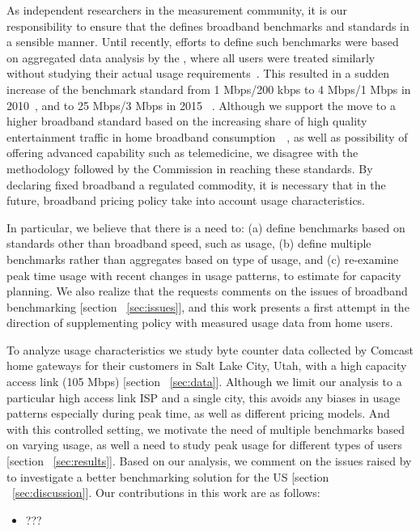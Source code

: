 As independent researchers in the measurement community, it is our responsibility to ensure that the \FCC defines broadband benchmarks and standards in a sensible manner. Until recently, efforts to define such benchmarks were based on aggregated data analysis by the \FCC, where all users were treated similarly without studying their actual usage requirements~\cite{report2010-2014}. This resulted in a sudden increase of the benchmark standard from 1 Mbps/200 kbps to 4 Mbps/1 Mbps in 2010~\cite{}, and to 25 Mbps/3 Mbps in 2015~\cite{} . Although we support the move to a higher broadband standard based on the increasing share of high quality entertainment traffic in home broadband consumption~\cite{sandvine2014report1}~\cite{sandvine2014report2}, as well as possibility of offering advanced capability such as telemedicine, we disagree with the methodology followed by the Commission in reaching these standards. By declaring fixed broadband a regulated commodity, it is necessary that in the future, broadband pricing policy take into account usage characteristics.


In particular, we believe that there is a need to: (a) define benchmarks based on standards other than broadband speed, such as usage, (b) define multiple benchmarks rather than aggregates based on type of usage, and (c) re-examine peak time usage with recent changes in usage patterns, to estimate for capacity planning. We also realize that the \FCC requests comments on the issues of broadband benchmarking [section ~\ref{sec:issues}], and this work presents a first attempt in the direction of supplementing \FCC policy with measured usage data from home users.




To analyze usage characteristics we study byte counter data collected by Comcast home gateways for their customers in Salt Lake City, Utah, with a high capacity access link (105 Mbps) [section ~\ref{sec:data}]. Although we limit our analysis to a particular high access link ISP and a single city, this avoids any biases in usage patterns especially during peak time, as well as different pricing models. And with this controlled setting, we motivate the need of multiple benchmarks based on varying usage, as well a need to study peak usage for different types of users [section ~\ref{sec:results}]. Based on our analysis, we comment on the issues raised by \FCC to investigate a better benchmarking solution for the US [section ~\ref{sec:discussion}]. Our contributions in this work are as follows:
\begin{itemize}
\item ???
\end{itemize}



